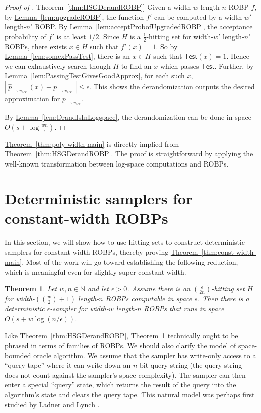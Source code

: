 \documentclass[11pt]{article}
\numberwithin{equation}{section}
\newtheorem{theorem}{Theorem}[section]
\theoremstyle{definition}
\theoremstyle{plain}
\newcommand{\N}{\mathbb N}
\newcommand{\expref}[2]{\hyperref[#2]{#1~\ref{#2}}}
\begin{document}
\begin{proof}[Proof of \expref{Theorem}{thm:HSGDerandROBP}] 
Given a width-$w$ length-$n$ ROBP $f$, by \expref{Lemma}{lem:upgradeROBP}, the function $f'$ can be computed by  a width-$w' $ length-$n' $ ROBP. By \expref{Lemma}{lem:acceptProbofUpgradedROBP}, the acceptance probability of $f'$ is at least $1/2$. Since $H$ is a $\frac{1}{2}$-hitting set for width-$w'$ length-$n'$ ROBPs, there exists $x\in H$ such that $f'(x) = 1$. So by \expref{Lemma}{lem:somexPassTest}, there is an $x\in H$ such that $\mathsf{Test}(x) = 1$. Hence we can  exhaustively search though $H$ to find an $x$ which passes $\mathsf{Test}$. Further, by \expref{Lemma}{lem:PassingTestGivesGoodApprox}, for each such $x$, $ |\: \widehat{p}_{ \to v_{\text{acc }} }(x)  - p_{ \to v_{\text{acc }} } \:| \leq \epsilon$. This shows the derandomization  outputs the desired approximation for $p_{ \to v_{\text{acc}} }$.

By \expref{Lemma}{lem:DrandIsInLogspace}, the derandomization can be done in space  $O(s+\log \frac{wn}{\epsilon})$.
\end{proof}

\expref{Theorem}{thm:poly-width-main} is directly implied from \expref{Theorem}{thm:HSGDerandROBP}. The proof is  straightforward by applying the %
well-known %
transformation between %
log-space %
computations and ROBPs.

\section{Deterministic samplers for constant-width ROBPs} \label{sec:constwidth}

In this section, we will show how to use hitting sets to construct deterministic samplers for constant-width ROBPs, thereby proving \expref{Theorem}{thm:const-width-main}. Most of the work will go toward establishing the following reduction, which is meaningful even for slightly super-constant width.

\begin{theorem} \label{thm:const-width-reduction}
Let $w, n \in \N$ and let $\epsilon > 0$. Assume there is an $(\frac{\epsilon}{2n})$-hitting set $H$ for width-$(\binom{w}{2} + 1)$ length-$n$ ROBPs computable in space $s$. Then there is a deterministic $\epsilon$-sampler for width-$w$ length-$n$ ROBPs that runs in space $O(s + w \log(n/\epsilon))$.
\end{theorem}

Like \expref{Theorem}{thm:HSGDerandROBP}, \expref{Theorem}{thm:const-width-reduction} technically ought to be phrased in terms of families of ROBPs. We should also clarify the model of space-bounded oracle algorithm. We assume that the sampler has write-only access to a ``query tape'' where it can write down an $n$-bit query string (the query string does not count against the sampler's space complexity). The sampler can then enter a special ``query'' state, which returns the result of the query into the algorithm's state and clears the query tape. This natural model was perhaps first studied by Ladner and Lynch \cite{LL76}.
\end{document}
